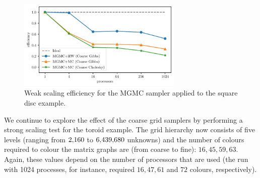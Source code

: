 \documentclass[
fontsize=11pt,
paper=a4,
numbers=noenddot
]{scrartcl}
\begin{document}
\begin{figure}[htbp]
    \centering
    \includegraphics[width=0.7\textwidth]{plots/ws_mgmc_fe.pdf}
    \caption{Weak scaling efficiency for the  MGMC sampler applied to the square disc example.}
    \label{fig:2d_unstructured_ws}
\end{figure}

We continue to explore the effect of the coarse grid samplers by performing a strong scaling test for the toroid example. The grid hierarchy now consists of five levels (ranging from $2{\small,}160$ to $6{\small,}439{\small,}680$ unknowns) and the number of colours required to colour the matrix graphs are (from coarse to fine): $16,45,59,63$. Again, these values depend on the number of processors that are used (the run with 1024 processes, for instance, required $16,47,61$ and $72$ colours, respectively). 
\end{document}
